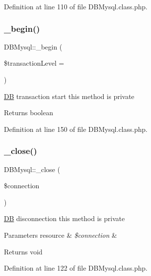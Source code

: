 Definition at line 110 of file D\+B\+Mysql.\+class.\+php.

\hypertarget{classDBMysql_a60dec65d2138fed25d0331e498972df8}{}\label{classDBMysql_a60dec65d2138fed25d0331e498972df8} 
\subsubsection{\texorpdfstring{\+\_\+begin()}{\_begin()}}
{\footnotesize\ttfamily D\+B\+Mysql\+::\+\_\+begin (\begin{DoxyParamCaption}\item[{}]{\$transaction\+Level = {} }\end{DoxyParamCaption})}

\hyperlink{classDB}{DB} transaction start this method is private \begin{DoxyReturn}{Returns}
boolean 
\end{DoxyReturn}


Definition at line 150 of file D\+B\+Mysql.\+class.\+php.

\hypertarget{classDBMysql_a59581237e4dcb5f91f63de2459248e13}{}\label{classDBMysql_a59581237e4dcb5f91f63de2459248e13} 
\subsubsection{\texorpdfstring{\+\_\+close()}{\_close()}}
{\footnotesize\ttfamily D\+B\+Mysql\+::\+\_\+close (\begin{DoxyParamCaption}\item[{}]{\$connection }\end{DoxyParamCaption})}

\hyperlink{classDB}{DB} disconnection this method is private 
\begin{DoxyParams}[1]{Parameters}
resource & {\em \$connection} & \\
\hline
\end{DoxyParams}
\begin{DoxyReturn}{Returns}
void 
\end{DoxyReturn}


Definition at line 122 of file D\+B\+Mysql.\+class.\+php.

\hypertarget{classDBMysql_a3f720677af37c36b2bc2934dd358a477}{}\label{classDBMysql_a3f720677af37c36b2bc2934dd358a477} 
